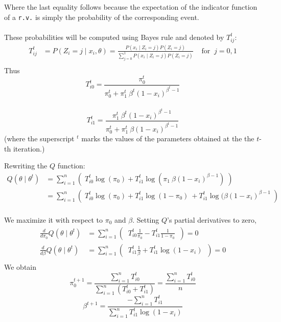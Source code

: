 \documentclass[12pt]{article}
\begin{document}
\begin{enumerate}[(a)]
  Where the last equality follows because the expectation of the indicator function of a \texttt{r.v.} is simply the probability of the corresponding event. \\
  \\
  These probabilities will be computed using Bayes rule and denoted by $T_{ij}^t$:
\begin{align*}  
T_{ij}^t &= P(Z_i = j \mid x_i, \theta) = \frac{P( x_i \mid Z_i = j) P(Z_i = j) } {\sum_{j=0}^1  P( x_i \mid Z_i = j) P(Z_i = j) }  \; \; \; \; \text{for} \; \; j = 0, 1 \\
\end{align*} 
Thus
$$
T_{i0}^t = \frac{\pi_0^t}{\pi_0^t + \pi_1^t \ \beta^t (1 - x_i)^{\beta^t - 1}} 
$$
\\
$$
T_{i1}^t = \frac{\pi_1^t \ \beta^t (1 - x_i)^{\beta^t - 1}} { \pi_0^t + \pi_1^t \ \beta (1 - x_i)^{\beta^t - 1} }
$$
(where the superscript $^t$ marks the values of the parameters obtained at the the $t$-th iteration.)

Rewriting the $Q$ function:
\begin{align*}
Q(\theta \mid \theta^t) &= \sum_{i=1}^n \left( \;  T_{i0}^t \log(\pi_0) + T_{i1}^t \log(\pi_1\ \beta (1 - x_i)^{\beta - 1}) \; \right) \\
&= \sum_{i=1}^n \left(\;  T_{i0}^t \log(\pi_0) + T_{i1}^t \log(1 - \pi_0) \ + T_{i1}^t \log (\beta (1 - x_i)^{\beta - 1} \;  \right) \\
\end{align*}

We maximize it with respect to $\pi_0$ and $\beta$. Setting $Q$'s partial derivatives to zero,
\begin{align*}
\frac{d}{d\pi_0} Q(\theta \mid \theta^t) &= \sum_{i=1}^n \left( \; \; 
 T_{i0}^t \frac{1}{\pi_0} - T_{i1}^t  \frac{1}{1 - \pi_0} \; \; \right) = 0\\
\frac{d}{d\beta} Q(\theta \mid \theta^t) &= \sum_{i=1}^n \left( \; \; 
T_{i1}^t  \frac{1}{\beta} + T_{i1}^t \log(1 - x_i)\; \; \right) = 0\\
\end{align*}
We obtain
$$\boxed{
\pi_0^{t+1} = \frac{\sum_{i=1}^n T_{i0}^t } {\sum_{i=1}^n \left( T_{i0}^t + T_{i1}^t \right)} = \frac{\sum_{i=1}^n T_{i0}^t } {n} }
$$
$$\boxed{
\beta^{t+1} = \frac{-\sum_{i=1}^n T_{i1}^t  } {\sum_{i=1}^n T_{i1}^t \log(1 - x_i) } }
$$
\\


\end{enumerate}
\end{document}
